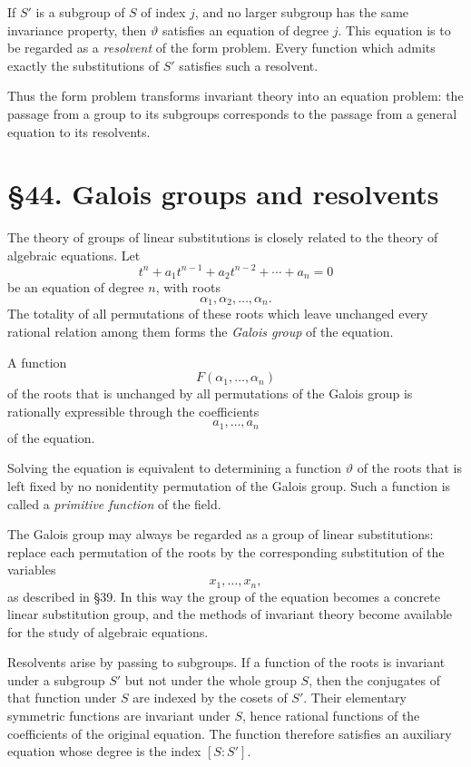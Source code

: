 \documentclass[11pt,a4paper]{book}
\newcommand{\webersection}[2]{\clearpage\section*{\S #1. #2}}
\begin{document}
If \(S'\) is a subgroup of \(S\) of index \(j\), and no larger subgroup has the same invariance property, then \(\vartheta\) satisfies an equation of degree \(j\).  This equation is to be regarded as a \emph{resolvent} of the form problem.  Every function which admits exactly the substitutions of \(S'\) satisfies such a resolvent.

Thus the form problem transforms invariant theory into an equation problem: the passage from a group to its subgroups corresponds to the passage from a general equation to its resolvents.

\webersection{44}{Galois groups and resolvents}

The theory of groups of linear substitutions is closely related to the theory of algebraic equations.  Let
\begin{equation}
t^n+a_1t^{n-1}+a_2t^{n-2}+\cdots+a_n=0
\end{equation}
be an equation of degree \(n\), with roots
\[
\alpha_1,\alpha_2,\ldots,\alpha_n.
\]
The totality of all permutations of these roots which leave unchanged every rational relation among them forms the \emph{Galois group} of the equation.

A function
\[
F(\alpha_1,\ldots,\alpha_n)
\]
of the roots that is unchanged by all permutations of the Galois group is rationally expressible through the coefficients
\[
a_1,\ldots,a_n
\]
of the equation.

Solving the equation is equivalent to determining a function \(\vartheta\) of the roots that is left fixed by no nonidentity permutation of the Galois group.  Such a function is called a \emph{primitive function} of the field.

The Galois group may always be regarded as a group of linear substitutions: replace each permutation of the roots by the corresponding substitution of the variables
\[
x_1,\ldots,x_n,
\]
as described in \S 39.  In this way the group of the equation becomes a concrete linear substitution group, and the methods of invariant theory become available for the study of algebraic equations.

Resolvents arise by passing to subgroups.  If a function of the roots is invariant under a subgroup \(S'\) but not under the whole group \(S\), then the conjugates of that function under \(S\) are indexed by the cosets of \(S'\).  Their elementary symmetric functions are invariant under \(S\), hence rational functions of the coefficients of the original equation.  The function therefore satisfies an auxiliary equation whose degree is the index \([S:S']\).
\end{document}
